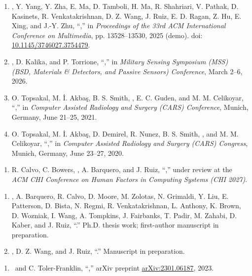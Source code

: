 \begin{enumerate}
\item \me, Y. Yang, Y. Zha, E. Ma, D. Tamboli, H. Ma, R. Shahriari, V. Pathak, D. Kasinets, R. Venkatakrishnan, D. Z. Wang, J. Ruiz, E. D. Ragan, Z. Hu, E. Xing, and J.-Y. Zhu, ``,'' in \textit{Proceedings of the 33rd ACM International Conference on Multimedia}, pp. 13528–13530, 2025 (demo). doi: \href{https://doi.org/10.1145/3746027.3754479}{10.1145/3746027.3754479}.
\item \me, D. Kalika, and P. Torrione, ``,'' in \textit{Military Sensing Symposium (MSS) (BSD, Materials \& Detectors, and Passive Sensors) Conference}, March 2–6, 2026.
\item O. Topsakal, M. İ. Akbaş, B. S. Smith, \me, E. C. Guden, and M. M. Celikoyar, ``,'' in \textit{Computer Assisted Radiology and Surgery (CARS) Conference}, Munich, Germany, June 21–25, 2021.
\item O. Topsakal, M. İ. Akbaş, D. Demirel, R. Nunez, B. S. Smith, \me, and M. M. Celikoyar, ``,'' in \textit{Computer Assisted Radiology and Surgery (CARS) Congress}, Munich, Germany, June 23–27, 2020.
\end{enumerate}
\begin{enumerate}
\item R. Calvo, C. Bowers, \me, A. Barquero, and J. Ruiz, ``,'' under review at the \textit{ACM CHI Conference on Human Factors in Computing Systems (CHI 2027)}.
\end{enumerate}
\begin{enumerate}
\item \me, A. Barquero, R. Calvo, D. Moore, M. Zolotas, N. Grimaldi, Y. Liu, E. Patterson, D. Bista, N. Regmi, R. Venkatakrishnan, L. Anthony, K. Brown, D. Wozniak, I. Wang, A. Tompkins, J. Fairbanks, T. Padir, M. Zahabi, D. Kaber, and J. Ruiz, ``.'' Ph.D. thesis work; first-author manuscript in preparation.
\item \me, D. Z. Wang, and J. Ruiz, ``.'' Manuscript in preparation.
\end{enumerate}
\begin{enumerate}
\item \me\ and C. Toler-Franklin, ``,'' arXiv preprint \href{https://arxiv.org/abs/2301.06187}{arXiv:2301.06187}, 2023.
\end{enumerate}
